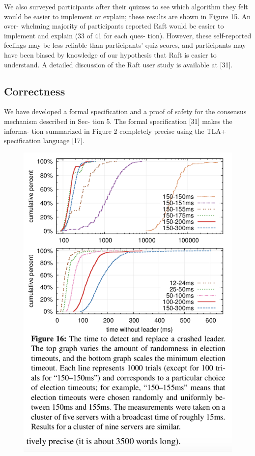\documentclass[journal]{IEEEtran}
\begin{document}
We also surveyed participants after their quizzes to see which algorithm they felt would be easier to implement or explain; these results are shown in Figure 15. An over- whelming majority of participants reported Raft would be easier to implement and explain (33 of 41 for each ques- tion). However, these self-reported feelings may be less reliable than participants’ quiz scores, and participants may have been biased by knowledge of our hypothesis that Raft is easier to understand.
A detailed discussion of the Raft user study is available at [31].

\subsection{Correctness}

We have developed a formal specification and a proof of safety for the consensus mechanism described in Sec- tion 5. The formal specification [31] makes the informa- tion summarized in Figure 2 completely precise using the TLA+ specification language [17]. 
\begin{figure}[htbp]
\begin{center}
\includegraphics[width=1\linewidth]{./fig16.png}
\end{center}
\end{figure}
\end{document}
